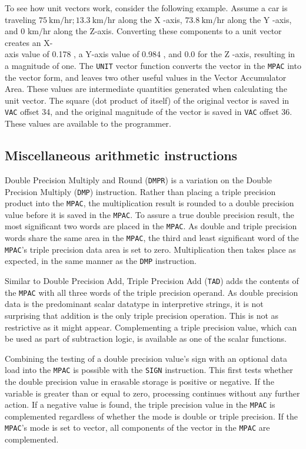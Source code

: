\documentclass[refcap, oxford]{ahsan}
\begin{document}
To see how unit vectors work, consider the following example. Assume a car is traveling $75 \mathrm{~km} / \mathrm{hr} ; 13.3 \mathrm{~km} / \mathrm{hr}$ along the X -axis, $73.8 \mathrm{~km} / \mathrm{hr}$ along the Y -axis, and 0 $\mathrm{km} / \mathrm{hr}$ along the Z-axis. Converting these components to a unit vector creates an X-\\
axis value of 0.178 , a Y-axis value of 0.984 , and 0.0 for the Z -axis, resulting in a magnitude of one. The \texttt{UNIT} vector function converts the vector in the \texttt{MPAC} into the vector form, and leaves two other useful values in the Vector Accumulator Area. These values are intermediate quantities generated when calculating the unit vector. The square (dot product of itself) of the original vector is saved in \texttt{VAC} offset 34, and the original magnitude of the vector is saved in \texttt{VAC} offset 36. These values are available to the programmer.


\subsection{Miscellaneous arithmetic instructions}
Double Precision Multiply and Round (\texttt{DMPR}) is a variation on the Double Precision Multiply (\texttt{DMP}) instruction. Rather than placing a triple precision product into the \texttt{MPAC}, the multiplication result is rounded to a double precision value before it is saved in the \texttt{MPAC}. To assure a true double precision result, the most significant two words are placed in the \texttt{MPAC}. As double and triple precision words share the same area in the \texttt{MPAC}, the third and least significant word of the \texttt{MPAC}'s triple precision data area is set to zero. Multiplication then takes place as expected, in the same manner as the \texttt{DMP} instruction.

Similar to Double Precision Add, Triple Precision Add (\texttt{TAD}) adds the contents of the \texttt{MPAC} with all three words of the triple precision operand. As double precision data is the predominant scalar datatype in interpretive strings, it is not surprising that addition is the only triple precision operation. This is not as restrictive as it might appear. Complementing a triple precision value, which can be used as part of subtraction logic, is available as one of the scalar functions.

Combining the testing of a double precision value's sign with an optional data load into the \texttt{MPAC} is possible with the \texttt{SIGN} instruction. This first tests whether the double precision value in erasable storage is positive or negative. If the variable is greater than or equal to zero, processing continues without any further action. If a negative value is found, the triple precision value in the \texttt{MPAC} is complemented regardless of whether the mode is double or triple precision. If the \texttt{MPAC}'s mode is set to vector, all components of the vector in the \texttt{MPAC} are complemented.
\end{document}
